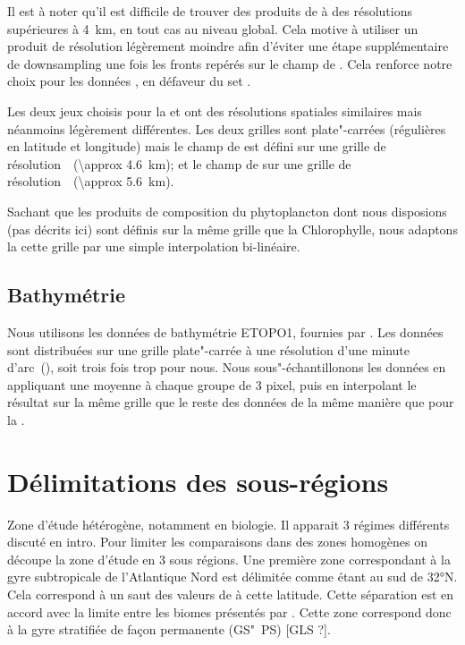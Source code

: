 \documentclass[index]{subfiles}
\begin{document}
Il est à noter qu'il est difficile de trouver des produits de  à des résolutions supérieures à \qty{4}{\km}, en tout cas au niveau global.
Cela motive à utiliser un produit  de résolution légèrement moindre afin d'éviter une étape supplémentaire de downsampling une fois les fronts repérés sur le champ de .
Cela renforce notre choix pour les données , en défaveur du set .

Les deux jeux choisis pour la  et  ont des résolutions spatiales similaires mais néanmoins légèrement différentes.
Les deux grilles sont plate"-carrées (régulières en latitude et longitude) mais le champ de  est défini sur une grille  de résolution~~(\qty{\approx 4.6}{\km}); et le champ de  sur une grille  de résolution~~(\qty{\approx 5.6}{\km}).

Sachant que les produits de composition du phytoplancton dont nous disposions (pas décrits ici) sont définis sur la même grille que la Chlorophylle, nous adaptons la  cette grille par une simple interpolation bi-linéaire.

\subsection{Bathymétrie}
\label{sec:donnees-bathymetrie}

Nous utilisons les données de bathymétrie ETOPO1, fournies par .
Les données sont distribuées sur une grille plate"-carrée à une résolution d'une minute d'arc~(), soit trois fois trop pour nous.
Nous sous"-échantillonons les données en appliquant une moyenne à chaque groupe de 3 pixel, puis en interpolant le résultat sur la même grille que le reste des données de la même manière que pour la .

\section{Délimitations des sous-régions}
\label{sec:delimitations-regions}

Zone d'étude hétérogène, notamment en biologie.
Il apparait 3 régimes différents discuté en intro.
Pour limiter les comparaisons dans des zones homogènes on découpe la zone d'étude en 3 sous régions.
Une première zone correspondant à la gyre subtropicale de l'Atlantique Nord est délimitée comme étant au sud de \ang{32}N.
Cela correspond à un saut des valeurs de  à cette latitude.
Cette séparation est en accord avec la limite entre les biomes présentés par \textcite{sarmiento_2004}.
Cette zone correspond donc à la gyre stratifiée de façon permanente (GS"~PS) [GLS ?].
\end{document}
